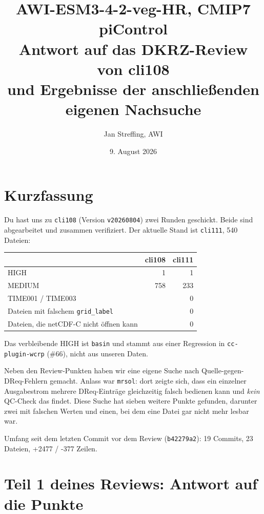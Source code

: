 \documentclass[11pt,a4paper]{article}
\title{AWI-ESM3-4-2-veg-HR, CMIP7 piControl\\[2mm]
\large Antwort auf das DKRZ-Review von cli108\\ und Ergebnisse der anschlie\ss enden eigenen Nachsuche}
\author{Jan Streffing, AWI}
\date{9. August 2026}
\newcommand{\code}[1]{\texttt{\small #1}}
\begin{document}
\maketitle

\section{Kurzfassung}

Du hast uns zu \code{cli108} (Version \code{v20260804}) zwei Runden geschickt.
Beide sind abgearbeitet und zusammen verifiziert. Der aktuelle Stand ist
\code{cli111}, 540 Dateien:

\begin{center}
\begin{tabular}{lrr}
\toprule
& \textbf{cli108} & \textbf{cli111} \\
\midrule
HIGH   & 1   & 1 \\
MEDIUM & 758 & 233 \\
TIME001 / TIME003 &  & 0 \\
Dateien mit falschem \code{grid\_label} &  & 0 \\
Dateien, die netCDF-C nicht \"offnen kann &  & 0 \\
\bottomrule
\end{tabular}
\end{center}

Das verbleibende HIGH ist \code{basin} und stammt aus einer Regression in
\code{cc-plugin-wcrp} (\#66), nicht aus unseren Daten.

Neben den Review-Punkten haben wir eine eigene Suche nach Quelle-gegen-DReq-Fehlern
gemacht. Anlass war \code{mrsol}: dort zeigte sich, dass ein einzelner Ausgabestrom
mehrere DReq-Eintr\"age gleichzeitig falsch bedienen kann und \emph{kein} QC-Check das
findet. Diese Suche hat sieben weitere Punkte gefunden, darunter zwei mit falschen
Werten und einen, bei dem eine Datei gar nicht mehr lesbar war.

Umfang seit dem letzten Commit vor dem Review (\code{b42279a2}): 19 Commits,
23 Dateien, +2477 / -377 Zeilen.

\section{Teil 1 deines Reviews: Antwort auf die Punkte}
\end{document}
